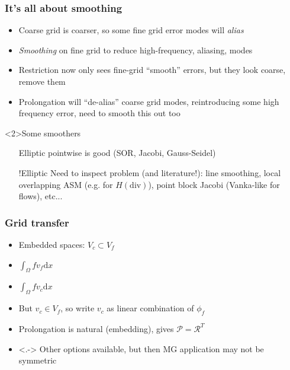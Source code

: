 \documentclass[presentation]{beamer}
\begin{document}
\begin{frame}
  \frametitle{It's all about smoothing}
  \begin{itemize}
  \item Coarse grid is coarser, so some fine grid error modes will
    \emph{alias}
  \item \emph{Smoothing} on fine grid to reduce high-frequency,
    aliasing, modes
  \item Restriction now only sees fine-grid ``smooth'' errors, but
    they look coarse, remove them
  \item Prolongation will ``de-alias'' coarse grid modes,
    reintroducing some high frequency error, need to smooth this out
    too
  \end{itemize}

  \begin{block}<2>{Some smoothers}
    \begin{itemize}
    \item[Elliptic] pointwise is good (SOR, Jacobi, Gauss-Seidel)
    \item[!Elliptic] Need to inspect problem (and literature!): line
      smoothing, local overlapping ASM (e.g. for $H(\text{div})$),
      point block Jacobi (Vanka-like for flows), etc...
    \end{itemize}
  \end{block}
\end{frame}

\begin{frame}
  \frametitle{Grid transfer}
  \begin{itemize}
  \item Embedded spaces: $V_c \subset V_f$
  \item<+->[Got] $\int_\Omega f v_f \mathrm{d}x$
  \item<+->[Want] $\int_\Omega f v_c \mathrm{d}x$
  \item<+-> But $v_c \in V_f$, so write $v_c$ as linear combination of
    ${\phi_f}$
  \item<+-> Prolongation is natural (embedding), gives $\mathcal{P} =
    \mathcal{R}^{T}$
  \item<.-> Other options available, but then MG application may not be
    symmetric
  \end{itemize}
\end{frame}
\end{document}
